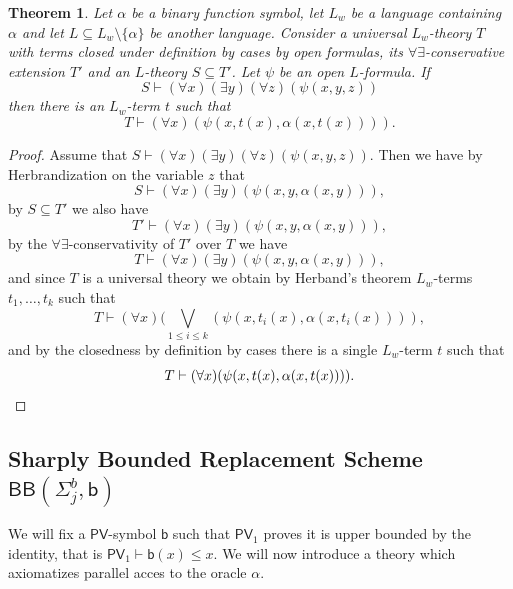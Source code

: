 \documentclass[11pt]{article}
\newcommand{\PV}{\mathsf{PV}}
\newcommand{\bd}{\mathsf{b}}
\newtheorem{theorem}{Theorem}[section]
\theoremstyle{definition}
\theoremstyle{definition}
\theoremstyle{remark}
\begin{document}
\begin{theorem}\label{theoremwitnessing}
    Let $\alpha$ be a binary function symbol, let $L_w$ be a language containing $\alpha$ and let $L\subseteq L_w\setminus \{\alpha\}$ be another language. Consider a universal $L_w$-theory $T$ with terms closed under definition by cases by open formulas, its $\forall\exists$-conservative extension $T'$ and an $L$-theory $S\subseteq T'$. Let $\psi$ be an open $L$-formula. If 
    \[S\vdash (\forall x)(\exists y)(\forall z)(\psi(x,y,z))\]
    then there is an $L_w$-term $t$ such that
    \[T\vdash (\forall x)(\psi(x,t(x),\alpha(x,t(x)))).\]
\end{theorem}
\begin{proof}
    Assume that $S\vdash (\forall x)(\exists y)(\forall z)(\psi(x,y,z))$. Then we have by Herbrandization on the variable $z$ that
    \[S\vdash (\forall x)(\exists y)(\psi(x,y,\alpha(x,y))),\]
    by $S\subseteq T'$ we also have
    \[T'\vdash (\forall x)(\exists y)(\psi(x,y,\alpha(x,y))),\]
    by the $\forall\exists$-conservativity of $T'$ over $T$ we have
    \[T\vdash (\forall x)(\exists y)(\psi(x,y,\alpha(x,y))),\]
    and since $T$ is a universal theory we obtain by Herband's theorem $L_w$-terms $t_1,\dots,t_k$ such that
    \[T\vdash (\forall x)(\bigvee_{1\leq i\leq k}(\psi(x,t_i(x),\alpha(x,t_i(x)))),\]
    and by the closedness by definition by cases there is a single $L_w$-term $t$ such that 
    \[T\vdash (\forall x)(\psi(x,t(x),\alpha(x,t(x)))).\qedhere\]
\end{proof}

\subsection{Sharply Bounded Replacement Scheme \texorpdfstring{$\mathsf{BB}(\Sigma^b_j,\bd)$}{BB}}

We will fix a $\PV$-symbol $\bd$ such that $\PV_1$ proves it is upper bounded by the identity, that is $\PV_1\vdash \bd(x)\leq x$. We will now introduce a theory which axiomatizes parallel acces to the oracle $\alpha$.
\end{document}
